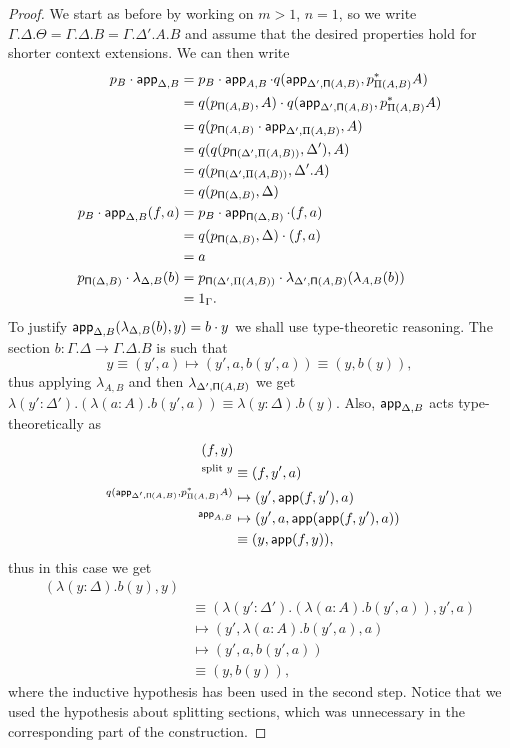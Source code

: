 \begin{proof}
  We start as before by working on $m>1$, $n=1$, so we write
  $\Gamma.\Delta.\Theta=\Gamma.\Delta.B=\Gamma.\Delta'.A.B$ and assume that
  the desired properties hold for shorter context extensions.
  We can then write
  \begin{align*}
    p_B\cdot\operatorname{\mathsf{app}}_{\Delta,B}
    &=p_B\cdot
    \operatorname{\mathsf{app}}_{A,B}\cdot
    q(\operatorname{\mathsf{app}}_{\Delta',\operatorname{\mathsf{\Pi}}(A,B)},p^*_{\Pi(A,B)}A) \\
    &=q(p_{\operatorname{\mathsf{\Pi}}(A,B)},A)\cdot
    q(\operatorname{\mathsf{app}}_{\Delta',\operatorname{\mathsf{\Pi}}(A,B)},p^*_{\Pi(A,B)}A) \\
    &=q(p_{\operatorname{\mathsf{\Pi}}(A,B)}\cdot\operatorname{\mathsf{app}}_{\Delta',\Pi(A,B)},A) \\
    &=q(q(p_{\operatorname{\mathsf{\Pi}}(\Delta',\Pi(A,B))},\Delta'),A) \\
    &=q(p_{\operatorname{\mathsf{\Pi}}(\Delta',\Pi(A,B))},\Delta'.A) \\
    &=q(p_{\operatorname{\mathsf{\Pi}}(\Delta,B)},\Delta) \\
    p_B\cdot\operatorname{\mathsf{app}}_{\Delta,B}(f,a)
    &=p_B\cdot
    \operatorname{\mathsf{app}}_{\operatorname{\mathsf{\Pi}}(\Delta,B)}\cdot
    (f,a) \\
    &=q(p_{\operatorname{\mathsf{\Pi}}(\Delta,B)},\Delta)\cdot
    (f,a) \\
    &=a \\
    p_{\operatorname{\mathsf{\Pi}}(\Delta,B)}\cdot\lambda_{\Delta,B}(b)
    &=p_{\operatorname{\mathsf{\Pi}}(\Delta',\Pi(A,B))}\cdot
    \lambda_{\Delta',\operatorname{\mathsf{\Pi}}(A,B)}(\lambda_{A,B}(b)) \\
    &=1_\Gamma.
  \end{align*}
  To justify $\operatorname{\mathsf{app}}_{\Delta,B}(\lambda_{\Delta,B}(b),y)=b\cdot y$ we shall use
  type-theoretic reasoning. The section
  $b\colon\Gamma.\Delta\rightarrow\Gamma.\Delta.B$ is
  such that\[y\equiv (y',a)\mapsto(y',a,b(y',a))\equiv(y,b(y)),\] thus
  applying $\lambda_{A,B}$ and then $\lambda_{\Delta',\operatorname{\mathsf{\Pi}}(A,B)}$ we get
  $\lambda(y':\Delta').(\lambda(a:A).b(y',a))\equiv\lambda(y:\Delta).b(y)$.
  Also, $\operatorname{\mathsf{app}}_{\Delta,B}$ acts type-theoretically as
  \begin{align*}
    (f,y) \\
    ^{\text{split } y}&\equiv(f,y',a) \\
    ^{q(\operatorname{\mathsf{app}}_{\Delta',\operatorname{\mathsf{\Pi}}(A,B)},p^*_{\Pi(A,B)}A)}&\mapsto
    (y',\operatorname{\mathsf{app}}(f,y'),a) \\
    ^{\operatorname{\mathsf{app}}_{A,B}}&\mapsto
    (y',a,\operatorname{\mathsf{app}}(\operatorname{\mathsf{app}}(f,y'),a)) \\
    &\equiv(y,\operatorname{\mathsf{app}}(f,y)),
  \end{align*}
  thus in this case we get
  \begin{align*}
    (\lambda(y:\Delta).b(y),y) \\
    &\equiv(\lambda(y':\Delta').(\lambda(a:A).b(y',a)),y',a) \\
    &\mapsto
    (y',\lambda(a:A).b(y',a),a) \\
    &\mapsto
    (y',a,b(y',a)) \\
    &\equiv(y,b(y)),
  \end{align*}
  where the inductive hypothesis has been used in the second step. Notice that
  we used the hypothesis about splitting sections, which was unnecessary in the
  corresponding part of the construction.
  

\end{proof}
